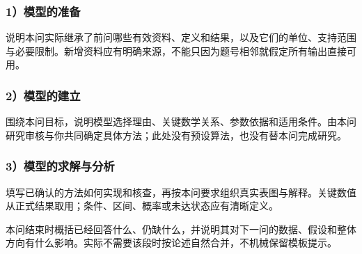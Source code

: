 \subsubsection*{1）模型的准备}
说明本问实际继承了前问哪些有效资料、定义和结果，以及它们的单位、支持范围与必要限制。新增资料应有明确来源，不能只因为题号相邻就假定所有输出直接可用。

\subsubsection*{2）模型的建立}
围绕本问目标，说明模型选择理由、关键数学关系、参数依据和适用条件。由本问研究审核与你共同确定具体方法；此处没有预设算法，也没有替本问完成研究。

\subsubsection*{3）模型的求解与分析}
填写已确认的方法如何实现和核查，再按本问要求组织真实表图与解释。关键数值从正式结果取用；条件、区间、概率或未达状态应有清晰定义。

本问结束时概括已经回答什么、仍缺什么，并说明其对下一问的数据、假设和整体方向有什么影响。实际不需要该段时按论述自然合并，不机械保留模板提示。
\FloatBarrier

